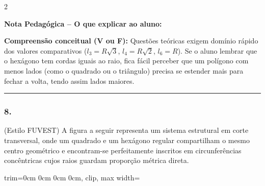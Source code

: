 \begin{multicols*}{2}
    \begin{boxpedagogica}
    \textbf{\textcolor{CorVerdeBorda}{Nota Pedagógica -- O que explicar ao aluno:}}\par\vspace{0.1cm}
    \color{CinzaEscuro}
    \textbf{Compreensão conceitual (V ou F):} Questões teóricas exigem domínio rápido dos valores comparativos ($l_3 = R\sqrt{3}$, $l_4 = R\sqrt{2}$, $l_6 = R$). Se o aluno lembrar que o hexágono tem cordas iguais ao raio, fica fácil perceber que um polígono com menos lados (como o quadrado ou o triângulo) precisa se estender mais para fechar a volta, tendo assim lados maiores.
    \end{boxpedagogica}
\fi

\par\vspace{\espacoQuestao}

\noindent\textcolor{CorLinha}{\rule{\linewidth}{0.5pt}} 
\par\vspace{\espacoPreQuestao}

\subsubsection*{8.} (Estilo FUVEST) A figura a seguir representa um sistema estrutural em corte transversal, onde um quadrado e um hexágono regular compartilham o mesmo centro geométrico e encontram-se perfeitamente inscritos em circunferências concêntricas cujos raios guardam proporção métrica direta.

\begin{center}
\begin{adjustbox}{trim=0cm 0cm 0cm 0cm, clip, max width=\larguraTikz}
\end{adjustbox}
\end{center}
\end{multicols*}

